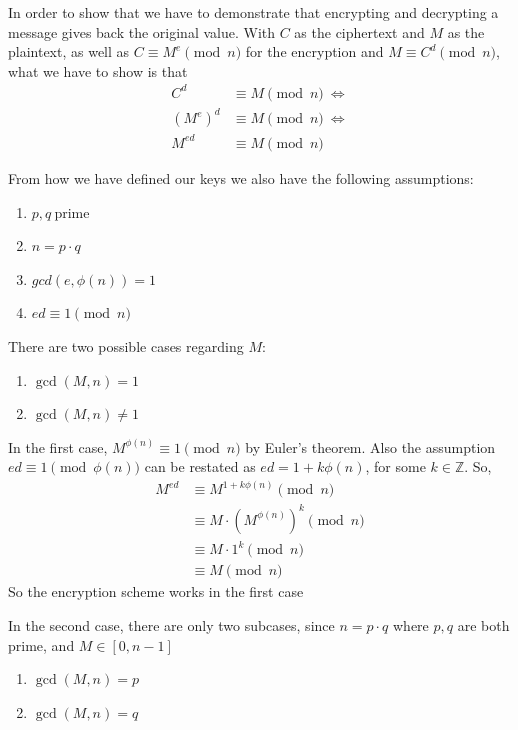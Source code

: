\documentclass[12pt, titlepage]{article}
\begin{document}
        In order to show that we have to demonstrate that encrypting and decrypting a
        message gives back the original value. With $C$ as the ciphertext and $M$ as the
        plaintext, as well as $C \equiv M^e \pmod{n}$ for the encryption and $M \equiv C^d
        \pmod{n}$, what we have to show is that
        \begin{align*}
            C^d     &\equiv M \pmod{n}\ \iff \\
            (M^e)^d &\equiv M \pmod{n}\ \iff \\
            M^{ed}  &\equiv M \pmod{n}
        \end{align*}

        From how we have defined our keys we also have the following assumptions:
        \begin{enumerate}
            \item $p,q\ \text{prime}$
            \item $n = p \cdot q$
            \item $gcd(e, \phi(n)) = 1$ 
            \item $ed \equiv 1 \pmod{n}$
        \end{enumerate}

        There are two possible cases regarding $M$:
        \begin{enumerate}
            \item $\gcd(M, n) = 1$
            \item $\gcd(M, n) \not= 1$
        \end{enumerate}

        In the first case, $M^{\phi(n)} \equiv 1 \pmod{n}$ by Euler's theorem. Also the
        assumption $ed \equiv 1 \pmod{\phi(n)}$ can be restated as $ed = 1 + k\phi(n)$, for
        some $k \in \mathbb{Z}$. So, 
        \begin{align*}
            M^{ed} &\equiv M^{1 + k\phi(n)} \pmod{n} \\
                   &\equiv M \cdot (M^{\phi(n)})^k  \pmod{n} \\
                   &\equiv M \cdot 1^k \pmod{n} \\
                   &\equiv M \pmod{n}
        \end{align*}
        So the encryption scheme works in the first case

        In the second case, there are only two subcases, since $n = p \cdot q$ where $p, q$
        are both prime, and $ M \in \left[0, n-1\right]$
        \renewcommand{\labelenumi}{2\alph{enumi}.}
        \begin{enumerate}
            \item $\gcd(M, n) = p$
            \item $\gcd(M, n) = q$
        \end{enumerate}
        
\end{document}
